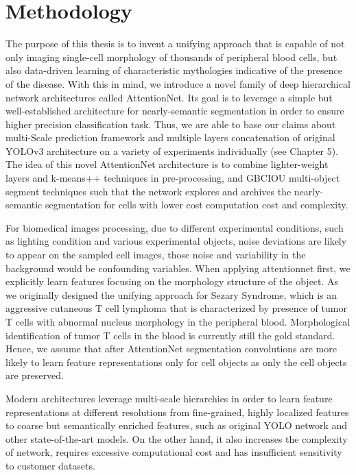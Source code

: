 \chapter{Methodology}
\label{sec:Methodology}
The purpose of this thesis is to invent a unifying approach that is capable of not only imaging single-cell morphology of thousands of peripheral blood cells, but also data-driven learning of characteristic mythologies indicative of the presence of the disease. With this in mind, we introduce a novel family of deep hierarchical network architectures called AttentionNet. Its goal is to leverage a simple but well-established architecture for nearly-semantic segmentation in order to ensure 
higher precision classification task. Thus, we are able to base our claims about multi-Scale prediction framework and multiple layers concatenation of original YOLOv3 architecture on a variety of experiments individually (see Chapter 5). The idea of this novel AttentionNet architecture is to combine lighter-weight layers  and k-means++ techniques in pre-processing, and GBCIOU multi-object segment techniques such that the network explores and archives the nearly-semantic segmentation for cells with lower cost computation cost and complexity.

For biomedical images processing, due to different experimental conditions, such as lighting condition and various  experimental objects, noise deviations are likely to appear on the sampled cell images\cite{b6}\cite{b7}, those noise and variability in the background would be confounding variables.
When applying attentionnet first, we explicitly learn features focusing on the morphology structure of the object. As we originally designed the unifying approach for Sezary Syndrome, which is an aggressive cutaneous T cell lymphoma that is characterized by presence of tumor T cells with abnormal nucleus morphology in the peripheral blood. Morphological identification of tumor T cells in the blood is currently still the gold standard.
Hence, we assume that after AttentionNet segmentation convolutions are more likely to learn feature representations only for cell objects as only the cell objects are preserved.

Modern architectures leverage multi-scale hierarchies in order to learn feature representations at different resolutions from fine-grained, highly localized features to coarse but semantically enriched features, such as original YOLO network and other state-of-the-art models. On the other hand, it also increases  the complexity of network, requires excessive computational cost and has insufficient sensitivity to customer datasets.

